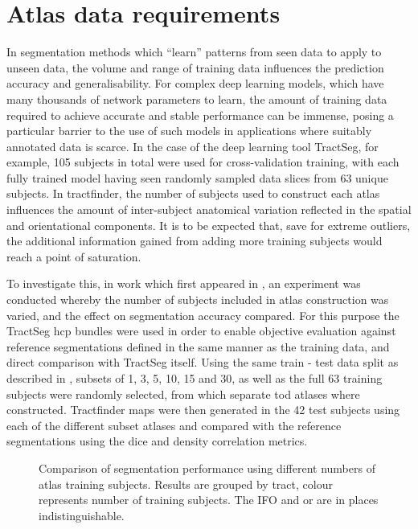\section{Atlas data requirements}\label{sec:ntrain}

In segmentation methods which ``learn'' patterns from seen data to apply to unseen data, the volume and range of training data influences the prediction accuracy and generalisability.
For complex deep learning models, which have many thousands of network parameters to learn, the amount of training data required to achieve accurate and stable performance can be immense, posing a particular barrier to the use of such models in applications where suitably annotated data is scarce.
In the case of the deep learning tool TractSeg\autocite{Wasserthal2018}, for example, 105 subjects in total were used for cross-validation training, with each fully trained model having seen randomly sampled data slices from 63 unique subjects.
In tractfinder, the number of subjects used to construct each atlas influences the amount of inter-subject anatomical variation reflected in the spatial and orientational components.
It is to be expected that, save for extreme outliers, the additional information gained from adding more training subjects would reach a point of saturation.

To investigate this, in work which first appeared in \textcite{Young2023}, an experiment was conducted whereby the number of subjects included in atlas construction was varied, and the effect on segmentation accuracy compared.
For this purpose the TractSeg \gls{hcp} bundles were used in order to enable objective evaluation against reference segmentations defined in the same manner as the training data, and direct comparison with TractSeg itself.
Using the same train - test data split as described in \textcite{Wasserthal2018b}, subsets of 1, 3, 5, 10, 15 and 30, as well as the full 63 training subjects were randomly selected, from which separate \gls{tod} atlases where constructed.
Tractfinder maps were then generated in the 42 test subjects using each of the different subset atlases and compared with the reference segmentations using the \gls{dice} and density correlation metrics.

\begin{figure}[htb!]
    \centering
    \caption[Tractfinder performance against number of atlas training subjects]{Comparison of segmentation performance using different numbers of atlas training subjects. Results are grouped by tract, colour represents number of training subjects. The IFO and \gls{or} are in places indistinguishable. }
    \label{fig:ntrain}
\end{figure}

